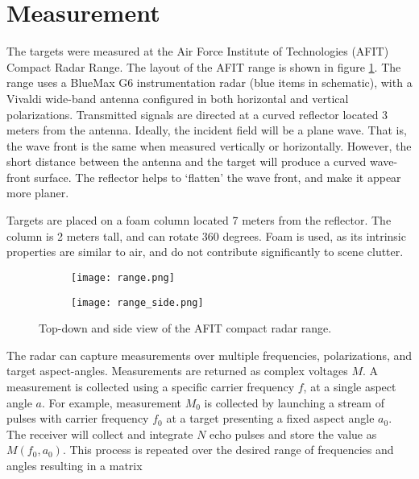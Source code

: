 \section{Measurement}
  The targets were measured at the Air Force Institute of Technologies (AFIT) Compact Radar Range. The layout of the AFIT range is shown in figure \ref{fig:range}. The range uses a BlueMax G6 instrumentation radar (blue items in schematic), with a Vivaldi wide-band antenna configured in both horizontal and vertical polarizations. Transmitted signals are directed at a curved reflector located 3 meters from the antenna. Ideally, the incident field will be a plane wave. That is, the wave front is the same when measured vertically or horizontally. However, the short distance between the antenna and the target will produce a curved wave-front surface. The reflector helps to `flatten' the wave front, and make it appear more planer.

  Targets are placed on a foam column located 7 meters from the reflector. The column is 2 meters tall, and can rotate 360 degrees. Foam is used, as its intrinsic properties are similar to air, and do not contribute significantly to scene clutter.

  \begin{figure}[htbp]
    \centering
    \begin{subfigure}{.8\textwidth}
      \centering
      \texttt{[image: range.png]}
    \end{subfigure}%
    \begin{subfigure}{.8\textwidth}
      \centering
      \texttt{[image: range\_side.png]}
    \end{subfigure}
    \caption[AFIT Compact Range Schematic]{Top-down and side view of the AFIT compact radar range.}
    \label{fig:range}
  \end{figure}

  The radar can capture measurements over multiple frequencies, polarizations, and target aspect-angles. Measurements are returned as complex voltages $M$. A measurement is collected using a specific carrier frequency $f$, at a single aspect angle $a$. For example, measurement $M_0$ is collected by launching a stream of pulses with carrier frequency $f_0$ at a target presenting a fixed aspect angle $a_0$. The receiver will collect and integrate $N$ echo pulses and store the value as $M(f_0, a_0)$. This process is repeated over the desired range of frequencies and angles resulting in a matrix

